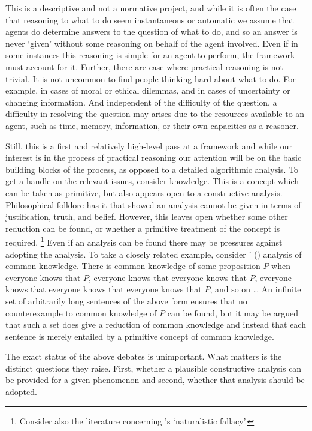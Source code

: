 \documentclass[10pt]{article}
\begin{document}
This is a descriptive and not a normative project, and while it is often the case that reasoning to what to do seem instantaneous or automatic we assume that agents do determine answers to the question of what to do, and so an answer is never `given' without some reasoning on behalf of the agent involved.
Even if in some instances this reasoning is simple for an agent to perform, the framework must account for it.
Further, there are case where practical reasoning is not trivial.
It is not uncommon to find people thinking hard about what to do.
For example, in cases of moral or ethical dilemmas, and in cases of uncertainty or changing information.
And independent of the difficulty of the question, a difficulty in resolving the question may arises due to the resources available to an agent, such as time, memory, information, or their own capacities as a reasoner.

Still, this is a first and relatively high-level pass at a framework and while our interest is in the process of practical reasoning our attention will be on the basic building  blocks of the process, as opposed to a detailed algorithmic analysis.
To get a handle on the relevant issues, consider knowledge.
This is a concept which can be taken as primitive, but also appears open to a constructive analysis.
Philosophical folklore has it that \textcite{Gettier:1963aa} showed an analysis cannot be given in terms of justification, truth, and belief.
However, this leaves open whether some other reduction can be found, or whether a primitive treatment of the concept is required.\nolinebreak
\footnote{Consider also the literature concerning \citeauthor{Moore:1903aa}'s `naturalistic fallacy'.}
Even if an analysis can be found there may be pressures against adopting the analysis.
To take a closely related example, consider \citeauthor{Lewis:1969aa}' (\citeyear{Lewis:1969aa}) analysis of common knowledge.
There is common knowledge of some proposition \(P\) when everyone knows that \(P\), everyone knows that everyone knows that \(P\), everyone knows that everyone knows that everyone knows that \(P\), and so on \dots
An infinite set of arbitrarily long sentences of the above form ensures that no counterexample to common knowledge of \(P\) can be found, but it may be argued that such a set does give a reduction of common knowledge and instead that each sentence is merely entailed by a primitive concept of common knowledge.

The exact status of the above debates is unimportant.
What matters is the distinct questions they raise.
First, whether a plausible constructive analysis can be provided for a given phenomenon and second, whether that analysis should be adopted.
\end{document}
